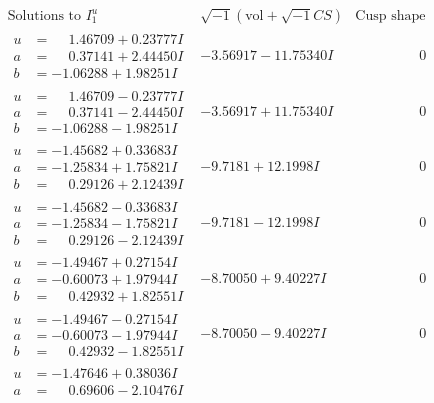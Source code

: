 \documentclass[1p]{elsarticle_modified}
\theoremstyle{definition}
\newcommand{\I}{\sqrt{-1}}
\begin{document}
$$\begin{array}{c|c|c}
\text{Solutions to }I^u_{1}& \I (\text{vol} + \sqrt{-1}CS) & \text{Cusp shape}\\
 \hline 
\begin{aligned}
u &= \phantom{-}1.46709 + 0.23777 I \\
a &= \phantom{-}0.37141 + 2.44450 I \\
b &= -1.06288 + 1.98251 I\end{aligned}
 & -3.56917 - 11.75340 I & \phantom{-0.000000 } 0 \\ \hline\begin{aligned}
u &= \phantom{-}1.46709 - 0.23777 I \\
a &= \phantom{-}0.37141 - 2.44450 I \\
b &= -1.06288 - 1.98251 I\end{aligned}
 & -3.56917 + 11.75340 I & \phantom{-0.000000 } 0 \\ \hline\begin{aligned}
u &= -1.45682 + 0.33683 I \\
a &= -1.25834 + 1.75821 I \\
b &= \phantom{-}0.29126 + 2.12439 I\end{aligned}
 & -9.7181 + 12.1998 I & \phantom{-0.000000 } 0 \\ \hline\begin{aligned}
u &= -1.45682 - 0.33683 I \\
a &= -1.25834 - 1.75821 I \\
b &= \phantom{-}0.29126 - 2.12439 I\end{aligned}
 & -9.7181 - 12.1998 I & \phantom{-0.000000 } 0 \\ \hline\begin{aligned}
u &= -1.49467 + 0.27154 I \\
a &= -0.60073 + 1.97944 I \\
b &= \phantom{-}0.42932 + 1.82551 I\end{aligned}
 & -8.70050 + 9.40227 I & \phantom{-0.000000 } 0 \\ \hline\begin{aligned}
u &= -1.49467 - 0.27154 I \\
a &= -0.60073 - 1.97944 I \\
b &= \phantom{-}0.42932 - 1.82551 I\end{aligned}
 & -8.70050 - 9.40227 I & \phantom{-0.000000 } 0 \\ \hline\begin{aligned}
u &= -1.47646 + 0.38036 I \\
a &= \phantom{-}0.69606 - 2.10476 I \\

\end{aligned}
\end{array}$$
\end{document}
